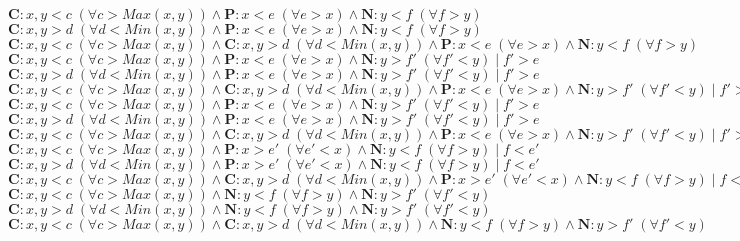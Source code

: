 \documentclass[a4paper]{article}
\begin{document}
\begin{landscape}
\noindent$\mathbf{C}:x,y<c\; (\forall c>Max(x,y))\wedge \mathbf{P}:x<e\;(\forall e>x)\wedge \mathbf{N}:y<f\; (\forall f>y)$\\
$\mathbf{C}:x,y>d\; (\forall d<Min(x,y))\wedge \mathbf{P}:x<e\;(\forall e>x)\wedge \mathbf{N}:y<f\; (\forall f>y)$\\
$\mathbf{C}:x,y<c\; (\forall c>Max(x,y))\wedge \mathbf{C}:x,y>d\; (\forall d<Min(x,y))\wedge \mathbf{P}:x<e\;(\forall e>x)\wedge \mathbf{N}:y<f\; (\forall f>y)$\\



\noindent$\mathbf{C}:x,y<c\; (\forall c>Max(x,y))\wedge \mathbf{P}:x<e\;(\forall e>x)\wedge \mathbf{N}:y>f'\; (\forall f'<y)\;|\; f'>e$\\
$\mathbf{C}:x,y>d\; (\forall d<Min(x,y))\wedge \mathbf{P}:x<e\;(\forall e>x)\wedge \mathbf{N}:y>f'\; (\forall f'<y)\;|\; f'>e$\\
$\mathbf{C}:x,y<c\; (\forall c>Max(x,y))\wedge \mathbf{C}:x,y>d\; (\forall d<Min(x,y))\wedge \mathbf{P}:x<e\;(\forall e>x)\wedge \mathbf{N}:y>f'\; (\forall f'<y)\;|\; f'>e$\\

\noindent$\mathbf{C}:x,y<c\; (\forall c>Max(x,y))\wedge \mathbf{P}:x<e\;(\forall e>x)\wedge \mathbf{N}:y>f'\; (\forall f'<y)\;|\; f'>e$\\
$\mathbf{C}:x,y>d\; (\forall d<Min(x,y))\wedge \mathbf{P}:x<e\;(\forall e>x)\wedge \mathbf{N}:y>f'\; (\forall f'<y)\;|\; f'>e$\\
$\mathbf{C}:x,y<c\; (\forall c>Max(x,y))\wedge \mathbf{C}:x,y>d\; (\forall d<Min(x,y))\wedge \mathbf{P}:x<e\;(\forall e>x)\wedge \mathbf{N}:y>f'\; (\forall f'<y)\;|\; f'>e$\\



\noindent$\mathbf{C}:x,y<c\; (\forall c>Max(x,y))\wedge \mathbf{P}:x>e'\; (\forall e'<x)\wedge \mathbf{N}:y<f\; (\forall f>y)\;|\; f<e'$\\
$\mathbf{C}:x,y>d\; (\forall d<Min(x,y))\wedge \mathbf{P}:x>e'\; (\forall e'<x)\wedge \mathbf{N}:y<f\; (\forall f>y)\;|\; f<e'$\\
$\mathbf{C}:x,y<c\; (\forall c>Max(x,y))\wedge \mathbf{C}:x,y>d\; (\forall d<Min(x,y))\wedge \mathbf{P}:x>e'\; (\forall e'<x)\wedge \mathbf{N}:y<f\; (\forall f>y)\;|\; f<e'$\\

\noindent$\mathbf{C}:x,y<c\; (\forall c>Max(x,y))\wedge \mathbf{N}:y<f\; (\forall f>y)\wedge \mathbf{N}:y>f'\; (\forall f'<y)$\\
$\mathbf{C}:x,y>d\; (\forall d<Min(x,y))\wedge \mathbf{N}:y<f\; (\forall f>y)\wedge \mathbf{N}:y>f'\; (\forall f'<y)$\\
$\mathbf{C}:x,y<c\; (\forall c>Max(x,y))\wedge \mathbf{C}:x,y>d\; (\forall d<Min(x,y))\wedge \mathbf{N}:y<f\; (\forall f>y)\wedge \mathbf{N}:y>f'\; (\forall f'<y)$\\



\end{landscape}
\end{document}
